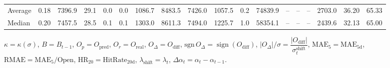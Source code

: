 \begin{threeparttable}
{\begin{tabular}{lrrrrrrrrrrrrrrrrr}
Average &     0.18 & 7396.9 &              29.1 &               0.0 &                0.0 &             1086.7 &  8483.5 & 7426.0 &     1057.5 &                      0.2 &             74839.9 &         -- &        -- &             -- &           2703.0 &           36.20 &                  65.33 \\
 Median &     0.20 & 7457.5 &              28.5 &               0.1 &                0.1 &             1303.0 &  8611.3 & 7494.0 &     1225.7 &                      1.0 &             58354.1 &         -- &        -- &             -- &           2439.6 &           32.13 &                  65.00 \\
\bottomrule
\end{tabular}
}
\begin{tablenotes}\footnotesize
\item $\kappa=\kappa(\sigma)$, $B=B_{t-1}$, $O_p=O_{\text{pred}}$, $O_r=O_{\text{real}}$, $O_\Delta=O_{\text{diff}}$, $\mathrm{sgn}\,O_\Delta=\operatorname{sign}(O_{\text{diff}})$, $|O_\Delta|/\sigma=\dfrac{|O_{\text{diff}}|}{\sigma_t^{\text{shift}}}$, $\mathrm{MAE}_5=\mathrm{MAE}_{5\text{d}}$, $\mathrm{RMAE}= \mathrm{MAE}_5 / \text{Open}$, $\mathrm{HR}_{20}=\mathrm{HitRate}_{20\text{d}}$, 
$\lambda_{\text{shift}}=\lambda_t$, 
$\Delta\alpha_t=\alpha_t-\alpha_{t-1}$.
\end{tablenotes}
\end{threeparttable}
\endgroup

